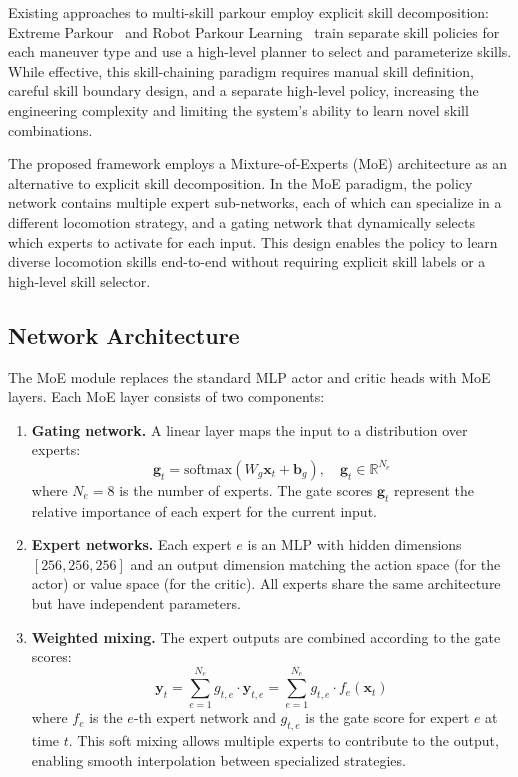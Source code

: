 Existing approaches to multi-skill parkour employ explicit skill decomposition: Extreme Parkour~\cite{cheng2024extremeparkour} and Robot Parkour Learning~\cite{zhuang2024robotparkour} train separate skill policies for each maneuver type and use a high-level planner to select and parameterize skills. While effective, this skill-chaining paradigm requires manual skill definition, careful skill boundary design, and a separate high-level policy, increasing the engineering complexity and limiting the system's ability to learn novel skill combinations.

The proposed framework employs a Mixture-of-Experts (MoE) architecture as an alternative to explicit skill decomposition. In the MoE paradigm, the policy network contains multiple expert sub-networks, each of which can specialize in a different locomotion strategy, and a gating network that dynamically selects which experts to activate for each input. This design enables the policy to learn diverse locomotion skills end-to-end without requiring explicit skill labels or a high-level skill selector.

\subsection{Network Architecture}

The MoE module replaces the standard MLP actor and critic heads with MoE layers. Each MoE layer consists of two components:

\begin{enumerate}
    \item \textbf{Gating network.} A linear layer maps the input to a distribution over experts:
    \begin{equation}
        \mathbf{g}_t = \text{softmax}(W_g \mathbf{x}_t + \mathbf{b}_g), \quad \mathbf{g}_t \in \mathbb{R}^{N_e}
    \end{equation}
    where $N_e = 8$ is the number of experts. The gate scores $\mathbf{g}_t$ represent the relative importance of each expert for the current input.

    \item \textbf{Expert networks.} Each expert $e$ is an MLP with hidden dimensions $[256, 256, 256]$ and an output dimension matching the action space (for the actor) or value space (for the critic). All experts share the same architecture but have independent parameters.

    \item \textbf{Weighted mixing.} The expert outputs are combined according to the gate scores:
    \begin{equation}
        \mathbf{y}_t = \sum_{e=1}^{N_e} g_{t,e} \cdot \mathbf{y}_{t,e} = \sum_{e=1}^{N_e} g_{t,e} \cdot f_e(\mathbf{x}_t)
    \end{equation}
    where $f_e$ is the $e$-th expert network and $g_{t,e}$ is the gate score for expert $e$ at time $t$. This soft mixing allows multiple experts to contribute to the output, enabling smooth interpolation between specialized strategies.
\end{enumerate}

